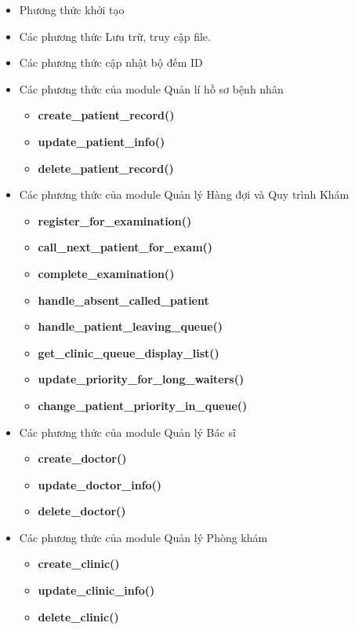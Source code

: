 \begin{itemize}
    \item Phương thức khởi tạo
    \item Các phương thức Lưu trữ, truy cập file.
    \item Các phương thức cập nhật bộ đếm ID
    \item Các phương thức của module Quản lí hồ sơ bệnh nhân
    \begin{itemize}
        \item \textbf{create\_patient\_record()}
        \item \textbf{update\_patient\_info()}
        \item \textbf{delete\_patient\_record()}
    \end{itemize}
    \item Các phương thức của module Quản lý Hàng đợi và Quy trình Khám
    \begin{itemize}
        \item \textbf{register\_for\_examination()}
        \item \textbf{call\_next\_patient\_for\_exam()}
        \item \textbf{complete\_examination()}
        \item \textbf{handle\_absent\_called\_patient}
        \item \textbf{handle\_patient\_leaving\_queue()}
        \item \textbf{get\_clinic\_queue\_display\_list()}
        \item \textbf{update\_priority\_for\_long\_waiters()}
        \item \textbf{change\_patient\_priority\_in\_queue()}
    \end{itemize}
    \item Các phương thức của module Quản lý Bác sĩ
    \begin{itemize}
        \item \textbf{create\_doctor()}
        \item \textbf{update\_doctor\_info()}
        \item \textbf{delete\_doctor()}
    \end{itemize}
    \item Các phương thức của module Quản lý Phòng khám
    \begin{itemize}
        \item \textbf{create\_clinic()}
        \item \textbf{update\_clinic\_info()}
        \item \textbf{delete\_clinic()}

\end{itemize}
\end{itemize}
